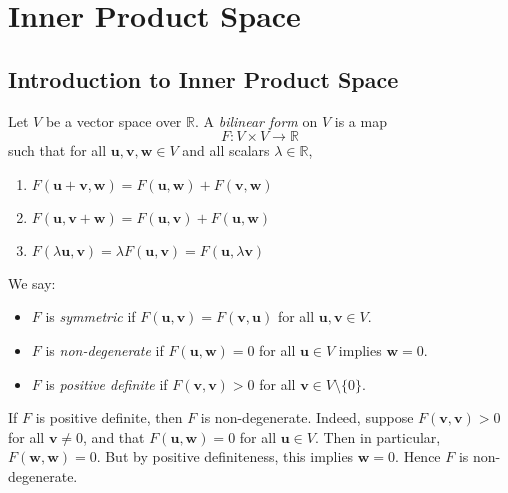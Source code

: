 \chapter{Inner Product Space}

\section{Introduction to Inner Product Space}
\begin{definition}\label{def:bilinear-form}
Let \( V \) be a vector space over \( \mathbb{R} \). A \emph{bilinear form} on \( V \) is a map
\[
F : V \times V \to \mathbb{R}
\]
such that for all \( \mathbf{u}, \mathbf{v}, \mathbf{w} \in V \) and all scalars \( \lambda \in \mathbb{R} \),
\begin{enumerate}
    \item \( F(\mathbf{u} + \mathbf{v}, \mathbf{w}) = F(\mathbf{u}, \mathbf{w}) + F(\mathbf{v}, \mathbf{w}) \)
    \item \( F(\mathbf{u}, \mathbf{v} + \mathbf{w}) = F(\mathbf{u}, \mathbf{v}) + F(\mathbf{u}, \mathbf{w}) \)
    \item \( F(\lambda \mathbf{u}, \mathbf{v}) = \lambda F(\mathbf{u}, \mathbf{v}) = F(\mathbf{u}, \lambda \mathbf{v}) \)
\end{enumerate}

We say:
\begin{itemize}
    \item \( F \) is \emph{symmetric} if \( F(\mathbf{u}, \mathbf{v}) = F(\mathbf{v}, \mathbf{u}) \) for all \( \mathbf{u}, \mathbf{v} \in V \).
    \item \( F \) is \emph{non-degenerate} if \( F(\mathbf{u}, \mathbf{w}) = 0 \) for all \( \mathbf{u} \in V \) implies \( \mathbf{w} = 0 \).
    \item \( F \) is \emph{positive definite} if \( F(\mathbf{v}, \mathbf{v}) > 0 \) for all \( \mathbf{v} \in V \setminus \{0\} \).
\end{itemize}
\end{definition}

\begin{remark}
If \( F \) is positive definite, then \( F \) is non-degenerate. Indeed, suppose \( F(\mathbf{v}, \mathbf{v}) > 0 \) for all \( \mathbf{v} \neq 0 \), and that \( F(\mathbf{u}, \mathbf{w}) = 0 \) for all \( \mathbf{u} \in V \). Then in particular, \( F(\mathbf{w}, \mathbf{w}) = 0 \). But by positive definiteness, this implies \( \mathbf{w} = 0 \). Hence \( F \) is non-degenerate.
\end{remark}

